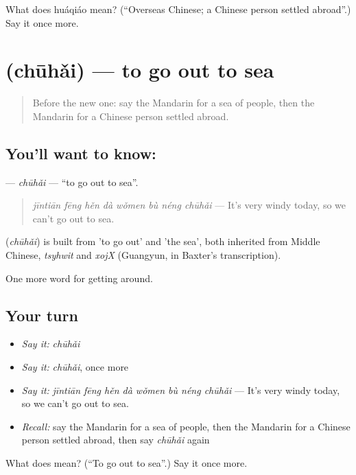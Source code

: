 \begin{tcolorbox}[breakable,colback=teal!4,colframe=teal!35!black,title={Before you move on}]
What does huáqiáo mean? (\textquotedblleft{}Overseas Chinese; a Chinese person settled abroad\textquotedblright{}.) Say it once more.
\end{tcolorbox}
\section[\texorpdfstring{\zh{出海} (chūhǎi)}{出海 (chūhǎi)}]{ (chūhǎi) — to go out to sea}

\label{lesson:ZH-C433-chuhai}



\begin{quote}
Before the new one: say the Mandarin for a sea of people, then the Mandarin for a Chinese person settled abroad.
\end{quote}

\subsection*{You'll want to know: }
\textbf{} — \emph{chūhǎi} — \textquotedblleft{}to go out to sea\textquotedblright{}.

\begin{quote}
\textbf{} \emph{jīntiān fēng hěn dà wǒmen bù néng chūhǎi} — It's very windy today, so we can't go out to sea.
\end{quote}

\begin{cousinweb}
\textbf{} (\emph{chūhǎi}) is built from  'to go out' and  'the sea', both inherited from Middle Chinese, \emph{tsyhwit} and \emph{xojX} (Guangyun, in Baxter's transcription).
\end{cousinweb}

\begin{grammarlens}[title={What you've built}]
One more word for getting around.
\end{grammarlens}

\subsection*{Your turn}
\begin{itemize}
\raggedright
  \item \emph{Say it:} \emph{chūhǎi}
  \item \emph{Say it:} \emph{chūhǎi}, once more
  \item \emph{Say it:} \emph{jīntiān fēng hěn dà wǒmen bù néng chūhǎi} — It's very windy today, so we can't go out to sea.
  \item \emph{Recall:} say the Mandarin for a sea of people, then the Mandarin for a Chinese person settled abroad, then say \emph{chūhǎi} again
\end{itemize}

\begin{tcolorbox}[breakable,colback=teal!4,colframe=teal!35!black,title={Before you move on}]
What does  mean? (\textquotedblleft{}To go out to sea\textquotedblright{}.) Say it once more.
\end{tcolorbox}
